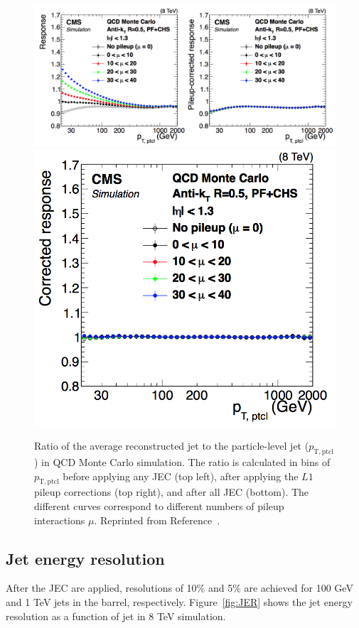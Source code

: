  \begin{figure}[h!]
	\centering
	\includegraphics[width=1.0\linewidth]{Figures/EventReconstruction/JEC1.png}
	\includegraphics[width=0.5\linewidth]{Figures/EventReconstruction/JEC2.png}
       \caption{Ratio of the average reconstructed jet \pt to the particle-level jet \pt ($p_{\mathrm{T,ptcl}}$) in QCD Monte Carlo simulation.
       The ratio is calculated in bins of $p_{\mathrm{T,ptcl}}$ before applying any JEC (top left), after applying the $L1$ pileup corrections
       (top right), and after all JEC (bottom). The different curves correspond to different numbers of pileup interactions $\mu$.
       Reprinted from Reference~\cite{JEC}.}
       \label{fig:JEC}
\end{figure}

\subsection{Jet energy resolution}
\label{sec:JER}

After the JEC are applied, resolutions of 10\% and 5\% are achieved for 100 GeV and 1 TeV jets in the barrel, respectively. Figure~\ref{fig:JER} shows the jet energy resolution as a function of jet \pt in 8 TeV simulation. 

